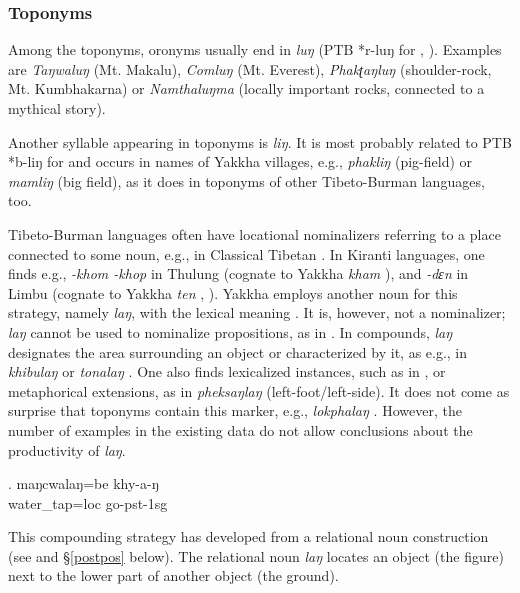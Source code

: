  
\subsubsection{Toponyms}
 
Among the toponyms, oronyms usually end in \emph{luŋ} (PTB *r-luŋ for , \citealt[50]{Matisoff2003Handbook}). Examples are \emph{Taŋwaluŋ} (Mt. Makalu), \emph{Comluŋ} (Mt. Everest), \emph{Phakʈaŋluŋ}  (shoulder-rock, Mt. Kumbhakarna) or \emph{Namthaluŋma} (locally important rocks, connected to a mythical story).

Another syllable appearing in toponyms is \emph{liŋ}. It  is most probably related to PTB *b-liŋ for   \citep[280]{Matisoff2003Handbook} and occurs in names of Yakkha villages, e.g., \emph{phakliŋ} (pig-field) or \emph{mamliŋ}  (big field), as it does in toponyms of other Tibeto-Burman languages, too.

Tibeto-Burman languages often have locational nominalizers referring to a place connected to some noun, e.g., in Classical Tibetan \citep[300]{Beyer1992_Tibetan}. In Kiranti languages, one finds e.g., \emph{-khom \ti -khop} in Thulung (cognate to Yakkha \emph{kham} ), and \emph{-dɛn} in Limbu (cognate to Yakkha \emph{ten} , \citealt[89]{Ebert1994The-structure}). Yakkha  employs another noun for this strategy, namely \emph{laŋ}, with the lexical meaning . It is, however, not a nominalizer;  \emph{laŋ} cannot be used to nominalize propositions, as in . In compounds, \emph{laŋ} designates the area surrounding an object or characterized by it, as e.g., in \emph{khibulaŋ}  or \emph{tonalaŋ} . One also finds lexicalized instances, such as in \Next, or metaphorical extensions, as in \emph{pheksaŋlaŋ}  (left-foot/left-side). It does not come as surprise that toponyms contain this marker, e.g., \emph{lokphalaŋ} . However, the number of examples in the existing data do not allow conclusions about the productivity of \emph{laŋ}. 

\exg. maŋcwalaŋ=be khy-a-ŋ\\
water\_tap{\sc =loc} go{\sc -pst-1sg}\\
  

This compounding strategy has developed from a relational noun construction (see \Next and §\ref{postpos} below). The relational noun \emph{laŋ} locates an object (the {\sc figure}) next to the lower part of another object (the {\sc ground}). 

